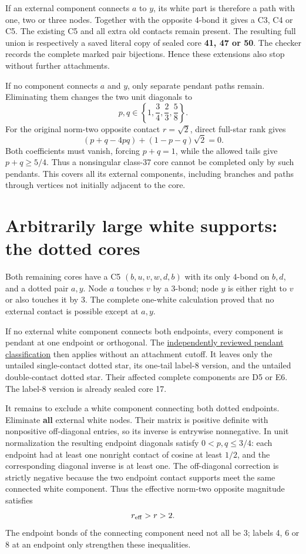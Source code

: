 \documentclass[
  10pt,
]{report}
\begin{document}
If an external component connects \(a\) to \(y\), its white part is
therefore a path with one, two or three nodes. Together with the
opposite 4-bond it gives a C3, C4 or C5. The existing C5 and all extra
old contacts remain present. The resulting full union is respectively a
saved literal copy of sealed core \textbf{41, 47 or 50}. The checker
records the complete marked pair bijections. Hence these extensions also
stop without further attachments.

If no component connects \(a\) and \(y\), only separate pendant paths
remain. Eliminating them changes the two unit diagonals to \[
p,q\in\left\{1,\frac34,\frac23,\frac58\right\}.
\] For the original norm-two opposite contact \(r=\sqrt2\), direct
full-star rank gives \[
(p+q-4pq)+(1-p-q)\sqrt2=0.
\] Both coefficients must vanish, forcing \(p+q=1\), while the allowed
tails give \(p+q\ge5/4\). Thus a nonsingular class-37 core cannot be
completed only by such pendants. This covers all its external
components, including branches and paths through vertices not initially
adjacent to the core.

\section{Arbitrarily large white supports: the dotted
cores}\label{arbitrarily-large-white-supports-the-dotted-cores}

Both remaining cores have a C5 \((b,u,v,w,d,b)\) with its only 4-bond on
\(b,d\), and a dotted pair \(a,y\). Node \(a\) touches \(v\) by a
3-bond; node \(y\) is either right to \(v\) or also touches it by 3. The
complete one-white calculation proved that no external contact is
possible except at \(a,y\).

If no external white component connects both endpoints, every component
is pendant at one endpoint or orthogonal. The
\href{fresh_sqrt2_dotted_tail_20261015.md}{independently reviewed
pendant classification} then applies without an attachment cutoff. It
leaves only the untailed single-contact dotted star, its one-tail
label-8 version, and the untailed double-contact dotted star. Their
affected complete components are D5 or E6. The label-8 version is
already sealed core 17.

It remains to exclude a white component connecting both dotted
endpoints. Eliminate \textbf{all} external white nodes. Their matrix is
positive definite with nonpositive off-diagonal entries, so its inverse
is entrywise nonnegative. In unit normalization the resulting endpoint
diagonals satisfy \(0<p,q\le3/4\): each endpoint had at least one
nonright contact of cosine at least \(1/2\), and the corresponding
diagonal inverse is at least one. The off-diagonal correction is
strictly negative because the two endpoint contact supports meet the
same connected white component. Thus the effective norm-two opposite
magnitude satisfies \[
r_{\rm eff}>r>2.
\] The endpoint bonds of the connecting component need not all be 3;
labels 4, 6 or 8 at an endpoint only strengthen these inequalities.
\end{document}
